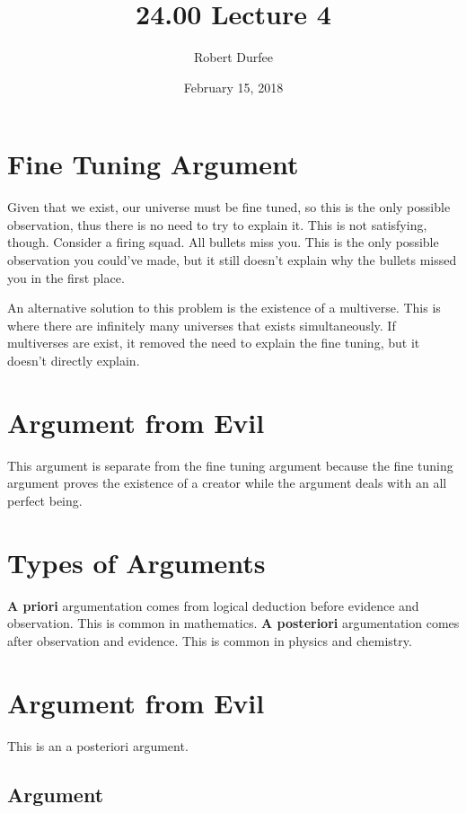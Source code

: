 \documentclass{article}
\title{ 24.00 Lecture 4 }
\author{ Robert Durfee }
\date{ February 15, 2018 }
\begin{document}
\maketitle

\section{ Fine Tuning Argument }

Given that we exist, our universe must be fine tuned, so this is the only
possible observation, thus there is no need to try to explain it. This is not
satisfying, though. Consider a firing squad. All bullets miss you. This is the
only possible observation you could've made, but it still doesn't explain why
the bullets missed you in the first place.

An alternative solution to this problem is the existence of a multiverse. This
is where there are infinitely many universes that exists simultaneously. If
multiverses are exist, it removed the need to explain the fine tuning, but it
doesn't directly explain.

\section{Argument from Evil}

This argument is separate from the fine tuning argument because the fine tuning
argument proves the existence of a creator while the argument deals with an all
perfect being.

\section{Types of Arguments}

\textbf{A priori} argumentation comes from logical deduction before evidence and
observation. This is common in mathematics. \textbf{A posteriori} argumentation
comes after observation and evidence. This is common in physics and chemistry.

\section{Argument from Evil}

This is an a posteriori argument.

\subsection{Argument}
\end{document}
